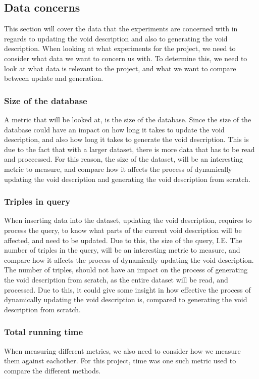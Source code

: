\subsection{Data concerns}\label{sec:concerns}
This section will cover the data that the experiments are concerned with in regards to updating the void description and also to generating the void description. When looking at what experiments for the project, we need to consider what data we want to concern us with. To determine this, we need to look at what data is relevant to the project, and what we want to compare between update and generation.

\subsubsection{Size of the database}
A metric that will be looked at, is the size of the database. Since the size of the database could have an impact on how long it takes to update the void description, and also how long it takes to generate the void description. This is due to the fact that with a larger dataset, there is more data that has to be read and proccessed. For this reason, the size of the dataset, will be an interesting metric to measure, and compare how it affects the process of dynamically updating the \gls{void} description and generating the void description from scratch.

\subsubsection{Triples in query}
When inserting data into the dataset, updating the \gls{void} description, requires to process the query, to know what parts of the current \gls{void} description will be affected, and need to be updated. Due to this, the size of the query, I.E. The number of triples in the query, will be an interesting metric to measure, and compare how it affects the process of dynamically updating the \gls{void} description. The number of triples, should not have an impact on the process of generating the \gls{void} description from scratch, as the entire dataset will be read, and processed. Due to this, it could give some insight in how effective the process of dynamically updating the \gls{void} description is, compared to generating the \gls{void} description from scratch.

\subsubsection{Total running time}
When measuring different metrics, we also need to consider how we measure them against eachother. For this project, time was one such metric used to compare the different methods.